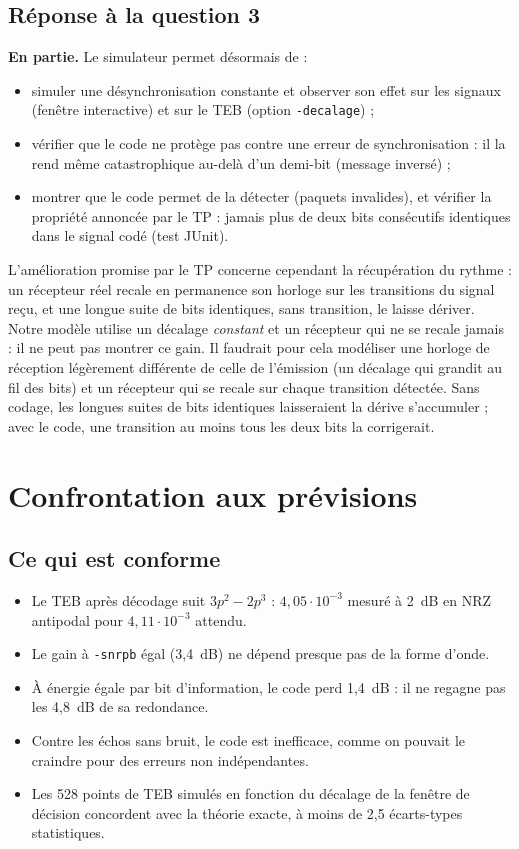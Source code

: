 \documentclass[11pt,a4paper]{article}
\begin{document}
\subsection{Réponse à la question 3}
\textbf{En partie.} Le simulateur permet désormais de :
\begin{itemize}
  \item simuler une désynchronisation constante et observer son effet sur les signaux (fenêtre interactive) et sur le TEB (option \texttt{-decalage}) ;
  \item vérifier que le code ne protège pas contre une erreur de synchronisation : il la rend même catastrophique au-delà d'un demi-bit (message inversé) ;
  \item montrer que le code permet de la détecter (paquets invalides), et vérifier la propriété annoncée par le TP : jamais plus de deux bits consécutifs identiques dans le signal codé (test JUnit).
\end{itemize}
L'amélioration promise par le TP concerne cependant la récupération du rythme : un récepteur réel recale en permanence son horloge sur les transitions du signal reçu, et une longue suite de bits identiques, sans transition, le laisse dériver. Notre modèle utilise un décalage \emph{constant} et un récepteur qui ne se recale jamais : il ne peut pas montrer ce gain. Il faudrait pour cela modéliser une horloge de réception légèrement différente de celle de l'émission (un décalage qui grandit au fil des bits) et un récepteur qui se recale sur chaque transition détectée. Sans codage, les longues suites de bits identiques laisseraient la dérive s'accumuler ; avec le code, une transition au moins tous les deux bits la corrigerait.

\section{Confrontation aux prévisions}
\subsection{Ce qui est conforme}
\begin{itemize}
  \item Le TEB après décodage suit $3p^2 - 2p^3$ : $4{,}05\cdot10^{-3}$ mesuré à 2~dB en NRZ antipodal pour $4{,}11\cdot10^{-3}$ attendu.
  \item Le gain à \texttt{-snrpb} égal (3,4~dB) ne dépend presque pas de la forme d'onde.
  \item À énergie égale par bit d'information, le code perd 1,4~dB : il ne regagne pas les 4,8~dB de sa redondance.
  \item Contre les échos sans bruit, le code est inefficace, comme on pouvait le craindre pour des erreurs non indépendantes.
  \item Les 528 points de TEB simulés en fonction du décalage de la fenêtre de décision concordent avec la théorie exacte, à moins de 2,5 écarts-types statistiques.
\end{itemize}
\end{document}
